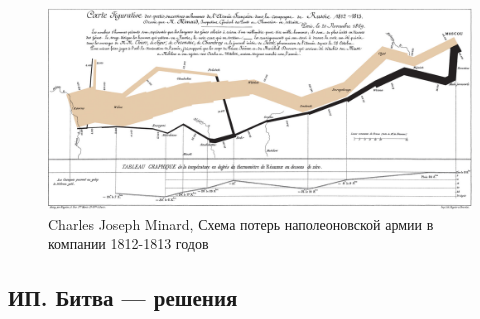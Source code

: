 \documentclass[12pt, a4paper]{article}\usepackage[]{graphicx}\usepackage[]{color}
\begin{document}
\begin{figure}[h!]
\includegraphics[width=19cm]{figures/Minard.png}
\caption*{Charles Joseph Minard, Схема потерь наполеоновской армии в компании 1812-1813 годов}
\end{figure}



\subsection{ИП. Битва — решения}
\end{document}
